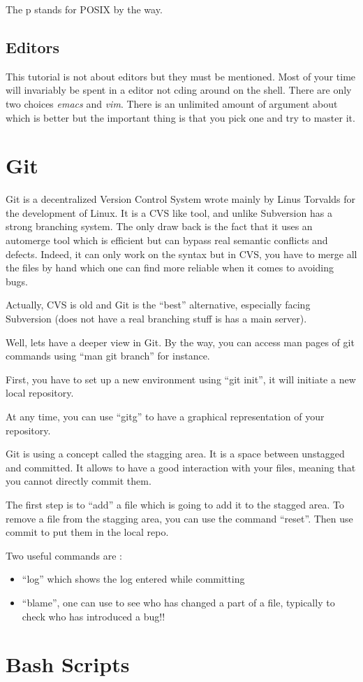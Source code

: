 \documentclass[10pt]{article}
\begin{document}
  The p stands for POSIX by the way.

  
  \subsection{Editors}
  This tutorial is not about editors but they must be mentioned. Most of your time will invariably be spent in a editor not cding around on the shell. There are only two choices \textit{emacs} and \textit{vim}. There is an unlimited amount of argument about which is better but the important thing is that you pick one and try to master it.

\section{Git}  

Git is a decentralized Version Control System wrote mainly by Linus Torvalds for the development of Linux.
It is a CVS like tool, and unlike Subversion has a strong branching system.
The only draw back is the fact that it uses an automerge tool which is efficient but can bypass real semantic conflicts and defects.
Indeed, it can only work on the syntax but in CVS, you have to merge all the files by hand which one can find more reliable when it comes to avoiding bugs.

Actually, CVS is old and Git is the ``best'' alternative, especially facing Subversion (does not have a real branching stuff is has a main server).

Well, lets have a deeper view in Git.
By the way, you can access man pages of git commands using ``man git branch'' for instance.

First, you have to set up a new environment using ``git init'', it will initiate a new local repository.

At any time, you can use ``gitg'' to have a graphical representation of your repository.

Git is using a concept called the stagging area. It is a space between unstagged and committed.
It allows to have a good interaction with your files, meaning that you cannot directly commit them.

The first step is to ``add'' a file which is going to add it to the stagged area.
To remove a file from the stagging area, you can use the command ``reset''.
Then use commit to put them in the local repo.

Two useful commands are :
\begin{itemize}
\item{``log'' which shows the log entered while committing}
\item{``blame'', one can use to see who has changed a part of a file, typically to check who has introduced a bug!!}
\end{itemize}

\section{Bash Scripts}





\end{document}
